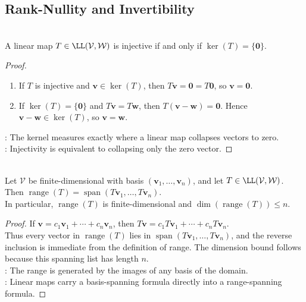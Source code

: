 \subsection{Rank-Nullity and Invertibility}
\begin{proposition} \label{prop:injective-iff-kernel-zero} \\
A linear map $T \in \LL(\mathcal{V}, \mathcal{W})$ is injective if and only if $\ker(T) = \{ \mathbf{0} \}$.
\begin{proof}
\begin{enumerate}[label=\roman*.]
\setlength{\itemsep}{0pt}
\item[$(\Rightarrow)$] If $T$ is injective and $\mathbf{v}\in\ker(T)$, then $T\mathbf{v}=\mathbf{0}=T\mathbf{0}$, so $\mathbf{v}=\mathbf{0}$.
\item[$(\Leftarrow)$] If $\ker(T)=\{\mathbf{0}\}$ and $T\mathbf{v}=T\mathbf{w}$, then $T(\mathbf{v}-\mathbf{w})=\mathbf{0}$. Hence $\mathbf{v}-\mathbf{w}\in\ker(T)$, so $\mathbf{v}=\mathbf{w}$.
\end{enumerate}
: The kernel measures exactly where a linear map collapses vectors to zero.\\
: Injectivity is equivalent to collapsing only the zero vector.
\end{proof}
\end{proposition}

\begin{theorem} \label{thm:range-spanned-by-images-of-basis} \\
Let $\mathcal{V}$ be finite-dimensional with basis $(\mathbf{v}_1,\ldots,\mathbf{v}_n)$, and let $T\in\LL(\mathcal{V},\mathcal{W})$. Then $\operatorname{range}(T)=\operatorname{span}(T\mathbf{v}_1,\ldots,T\mathbf{v}_n)$.\\
In particular, $\operatorname{range}(T)$ is finite-dimensional and $\dim(\operatorname{range}(T))\leq n$.
\begin{proof}
If $\mathbf{v}=c_1\mathbf{v}_1+\cdots+c_n\mathbf{v}_n$, then $T\mathbf{v}=c_1T\mathbf{v}_1+\cdots+c_nT\mathbf{v}_n$.\\
Thus every vector in $\operatorname{range}(T)$ lies in $\operatorname{span}(T\mathbf{v}_1,\ldots,T\mathbf{v}_n)$, and the reverse inclusion is immediate from the definition of range. The dimension bound follows because this spanning list has length $n$.\\
: The range is generated by the images of any basis of the domain.\\
: Linear maps carry a basis-spanning formula directly into a range-spanning formula.
\end{proof}
\end{theorem}

